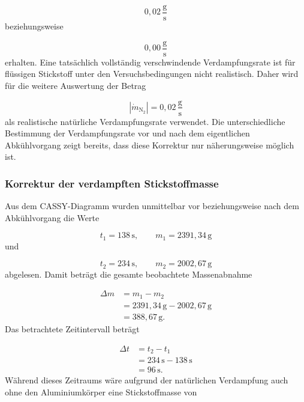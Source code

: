 \documentclass{report}
\begin{document}
\begin{equation}
0{,}02\,\mathrm{\frac{g}{s}}
\end{equation}
\noindent
beziehungsweise

\begin{equation}
0{,}00\,\mathrm{\frac{g}{s}}
\end{equation}
\noindent
erhalten. Eine tatsächlich vollständig verschwindende Verdampfungsrate ist für
flüssigen Stickstoff unter den Versuchsbedingungen nicht realistisch. Daher wird
für die weitere Auswertung der Betrag

\begin{equation}
\boxed{
\left|\dot m_\mathrm{N_2}\right|
=
0{,}02\,\mathrm{\frac{g}{s}}
}
\end{equation}
\noindent
als realistische natürliche Verdampfungsrate verwendet.
\noindent
Die unterschiedliche Bestimmung der Verdampfungsrate vor und nach dem eigentlichen
Abkühlvorgang zeigt bereits, dass diese Korrektur nur näherungsweise möglich ist.


\subsubsection{Korrektur der verdampften Stickstoffmasse}
\noindent
Aus dem CASSY-Diagramm wurden unmittelbar vor beziehungsweise nach dem
Abkühlvorgang die Werte

\begin{equation}
t_1=138\,\mathrm{s},
\qquad
m_1=2391{,}34\,\mathrm{g}
\end{equation}
\noindent
und

\begin{equation}
t_2=234\,\mathrm{s},
\qquad
m_2=2002{,}67\,\mathrm{g}
\end{equation}
\noindent
abgelesen.
\noindent
Damit beträgt die gesamte beobachtete Massenabnahme

\begin{align}
\Delta m
&=
m_1-m_2\\
&=
2391{,}34\,\mathrm{g}
-
2002{,}67\,\mathrm{g}\\
&=
388{,}67\,\mathrm{g}.
\end{align}
\noindent
Das betrachtete Zeitintervall beträgt

\begin{align}
\Delta t
&=
t_2-t_1\\
&=
234\,\mathrm{s}-138\,\mathrm{s}\\
&=
96\,\mathrm{s}.
\end{align}
\noindent
Während dieses Zeitraums wäre aufgrund der natürlichen Verdampfung auch ohne den
Aluminiumkörper eine Stickstoffmasse von
\end{document}
